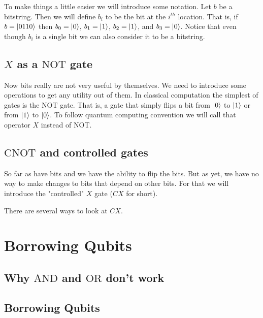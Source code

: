 \documentclass{article}
\begin{document}
To make things a little easier we will introduce some notation. Let 
$b$ be a bitstring. Then we will define $b_i$ to be the bit at the $i^{th}$ 
location. That is, if $b=\ket{0110}$ then $b_0=\ket{0}$, $b_1=\ket{1}$, 
$b_2=\ket{1}$, and $b_3=\ket{0}$. Notice that even though $b_i$ is a single 
bit we can also consider it to be a bitstring.

\subsection{$X$ as a $\mathrm{NOT}$ gate}

Now bits really are not very useful by themselves. We need to introduce some
operations to get any utility out of them. In classical computation the 
simplest of gates is the $\mathrm{NOT}$ gate. That is, a gate that simply
flips a bit from $\ket{0}$ to $\ket{1}$ or from $\ket{1}$ to $\ket{0}$. To
follow quantum computing convention we will call that operator $X$ instead 
of $\mathrm{NOT}$. 

\subsection{$\mathrm{CNOT}$ and controlled gates}

So far as have bits and we have the ability to flip the bits. But as yet,
we have no way to make changes to bits that depend on other bits. For that
we will introduce the "controlled" $X$ gate ($CX$ for short).

There are several ways to look at $CX$.

\section{Borrowing Qubits}
\subsection{Why $\mathrm{AND}$ and $\mathrm{OR}$ don't work}
\subsection{Borrowing Qubits}
\end{document}
